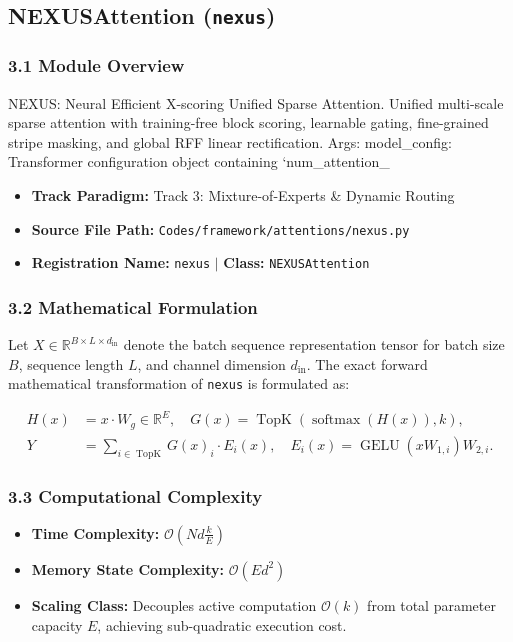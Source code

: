 \subsection{NEXUSAttention (\texttt{nexus})}
\label{sec:app_module_nexus}

\subsubsection*{3.1 Module Overview}
NEXUS: Neural Efficient X-scoring Unified Sparse Attention.  Unified multi-scale sparse attention with training-free block scoring, learnable gating, fine-grained stripe masking, and global RFF linear rectification.  Args:     model\_config: Transformer configuration object containing `num\_attention\_
\begin{itemize}
    \item \textbf{Track Paradigm:} Track 3: Mixture-of-Experts & Dynamic Routing
    \item \textbf{Source File Path:} \texttt{Codes/framework/attentions/nexus.py}
    \item \textbf{Registration Name:} \texttt{nexus} $\mid$ \textbf{Class:} \texttt{NEXUSAttention}
\end{itemize}

\subsubsection*{3.2 Mathematical Formulation}
Let $X \in \mathbb{R}^{B \times L \times d_{\text{in}}}$ denote the batch sequence representation tensor for batch size $B$, sequence length $L$, and channel dimension $d_{\text{in}}$. The exact forward mathematical transformation of \texttt{nexus} is formulated as:

\begin{align}
H(x) &= x \cdot W_g \in \mathbb{R}^{E}, \quad G(x) = \operatorname{TopK}\left(\operatorname{softmax}(H(x)), k\right), \\
Y &= \sum_{i \in \operatorname{TopK}} G(x)_i \cdot E_i(x), \quad E_i(x) = \operatorname{GELU}(x W_{1, i}) W_{2, i}.
\end{align}


\subsubsection*{3.3 Computational Complexity}
\begin{itemize}
    \item \textbf{Time Complexity:} $\mathcal{O}(N d \frac{k}{E})$
    \item \textbf{Memory State Complexity:} $\mathcal{O}(E d^2)$
    \item \textbf{Scaling Class:} Decouples active computation $\mathcal{O}(k)$ from total parameter capacity $E$, achieving sub-quadratic execution cost.
\end{itemize}

